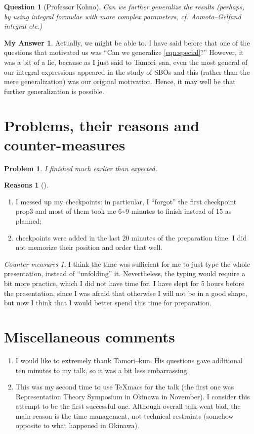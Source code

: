 \documentclass[12pt]{article} %
\theoremstyle{theorem}
\newtheorem{problem}{Problem}
\newtheorem{question}{Question}
\theoremstyle{definition}
\newtheorem{answer}{My Answer}
\newtheorem{reason}{Reasons}
\theoremstyle{remark}
\newtheorem{countermeasure}{Counter-measures}
\begin{document}
\begin{question}[Professor Kohno]
    Can we further generalize the results (perhaps, by using integral formulae with more complex
    parameters, cf. Aomoto--Gelfand integral etc.)
\end{question}
\begin{answer}
    Actually, we might be able to. I have said before that one of the questions that
    motivated us was ``Can we generalize \eqref{eqn:special}?'' However, it was a bit of a lie,
    because as I just said to Tamori--san, even the most general of our integral expressions appeared
    in the study of SBOs and this (rather than the mere generalization) was our original motivation.
    Hence, it may well be that further generalization is possible.
\end{answer}
\section{Problems, their reasons and counter-measures}
\begin{problem}
	I finished much earlier than expected.
\end{problem}
\begin{reason}[]
	\begin{enumerate}
		\item I messed up my checkpoints: in particular, I ``forgot'' the first
			checkpoint {\ttfamily prop3} and most of them took me 6\textasciitilde9 minutes
			to finish instead of 15 as planned;
		\item checkpoints were added in the last 20 minutes of the preparation time: I did not memorize their
			position and order that well.
	\end{enumerate}
\end{reason}
\begin{countermeasure}
	I think the time was sufficient for me to just type the whole presentation, instead of ``unfolding'' it.
	Nevertheless, the typing would require a bit more practice, which I did not have time for.
	I have slept for 5 hours before the presentation, since I was afraid that otherwise I will not be in a good shape,
	but now I think that I would better spend this time for preparation.
\end{countermeasure}
\section{Miscellaneous comments}
\begin{enumerate}
    \item I would like to extremely thank Tamori--kun. His questions gave additional ten minutes to
        my talk, so it was a bit less embarrassing.
    \item This was my second time to use TeXmacs for the talk (the first one was Representation Theory
        Symposium in Okinawa in November). I consider this attempt to be the first successful one.
        Although overall talk went bad, the main reason is the time management, not technical restraints
        (somehow opposite to what happened in Okinawa).
\end{enumerate}
\end{document}
